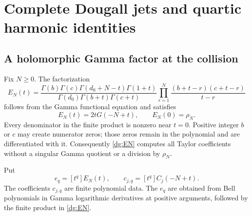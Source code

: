 \section{Complete Dougall jets and quartic harmonic identities}
\label{dg:jetssection}

\subsection{A holomorphic Gamma factor at the collision}
Fix $N\ge0$. The factorization
\begin{equation}\label{dg:EN}
 E_N(t)=
 \frac{\Gamma(b)\Gamma(c)\Gamma(d_0+N-t)\Gamma(1+t)}
 {\Gamma(d_0)\Gamma(b+t)\Gamma(c+t)}
 \prod_{r=1}^{N}\frac{(b+t-r)(c+t-r)}{t-r}
\end{equation}
follows from the Gamma functional equation and satisfies
\begin{equation}\label{dg:ENidentity}
 E_N(t)=2tG(-N+t),\qquad E_N(0)=\rho_N.
\end{equation}
Every denominator in the finite product is nonzero near $t=0$.
Positive integer $b$ or $c$ may create numerator zeros; those zeros
remain in the polynomial and are differentiated with it. Consequently
\eqref{dg:EN} computes all Taylor coefficients without a singular
Gamma quotient or a division by $\rho_N$.

Put
\begin{equation}\label{dg:jetcoeffs}
 e_q=[t^q]E_N(t),\qquad c_{j,q}=[t^q]C_j(-N+t).
\end{equation}
The coefficients $c_{j,q}$ are finite polynomial data. The $e_q$ are
obtained from Bell polynomials in Gamma logarithmic derivatives at
positive arguments, followed by the finite product in \eqref{dg:EN}.

